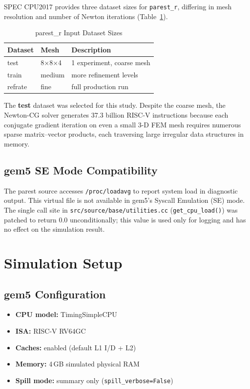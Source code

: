 \documentclass[conference]{IEEEtran}
\begin{document}
SPEC CPU2017 provides three dataset sizes for \texttt{parest\_r},
differing in mesh resolution and number of Newton iterations
(Table~\ref{tab:inputs}).

\begin{table}[H]
\centering
\caption{parest\_r Input Dataset Sizes}
\label{tab:inputs}
\begin{tabular}{lll}
\toprule
\textbf{Dataset} & \textbf{Mesh} & \textbf{Description} \\
\midrule
test    & 8$\times$8$\times$4    & 1 experiment, coarse mesh \\
train   & medium                 & more refinement levels \\
refrate & fine                   & full production run \\
\bottomrule
\end{tabular}
\end{table}

The \textbf{test} dataset was selected for this study. Despite the
coarse mesh, the Newton-CG solver generates 37.3 billion RISC-V
instructions because each conjugate gradient iteration on even a
small 3-D FEM mesh requires numerous sparse matrix--vector products,
each traversing large irregular data structures in memory.

\subsection{gem5 SE Mode Compatibility}

The parest source accesses \texttt{/proc/loadavg} to report system
load in diagnostic output. This virtual file is not available in
gem5's Syscall Emulation (SE) mode. The single call site in
\texttt{src/source/base/utilities.cc} (\texttt{get\_cpu\_load()})
was patched to return 0.0 unconditionally; this value is used
only for logging and has no effect on the simulation result.

\section{Simulation Setup}

\subsection{gem5 Configuration}

\begin{itemize}
    \item \textbf{CPU model:}   TimingSimpleCPU
    \item \textbf{ISA:}         RISC-V RV64GC
    \item \textbf{Caches:}      enabled (default L1 I/D + L2)
    \item \textbf{Memory:}      4\,GB simulated physical RAM
    \item \textbf{Spill mode:}  summary only (\texttt{spill\_verbose=False})
\end{itemize}
\end{document}
